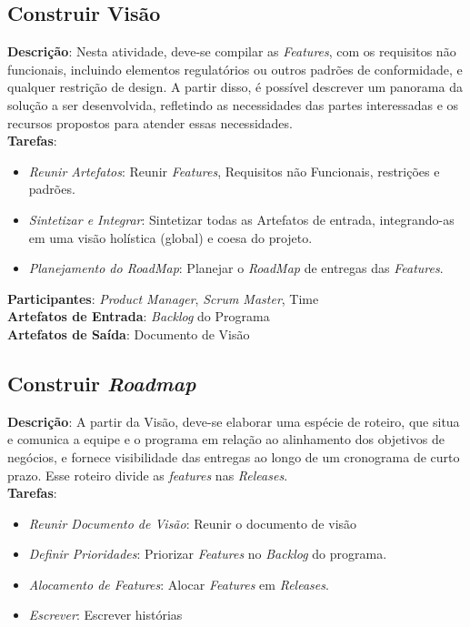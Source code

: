 \subsection{Construir Visão}
  \textbf{Descrição}: Nesta atividade, deve-se compilar as \textit{Features}, com os requisitos não funcionais, incluindo elementos
  regulatórios ou outros padrões de conformidade, e qualquer restrição de design. A partir disso, é possível descrever um panorama da solução a
  ser desenvolvida, refletindo as necessidades das partes interessadas e os recursos propostos para atender essas necessidades. \\

  \textbf{Tarefas}:
  \begin{itemize}
   \item \indent \textit{Reunir Artefatos}: Reunir \textit{Features}, Requisitos não Funcionais, restrições e padrões.

   \item \indent \textit{Sintetizar e Integrar}: Sintetizar todas as Artefatos de entrada, integrando-as em uma visão holística (global) e coesa do projeto.

   \item \indent \textit{Planejamento do \textit{RoadMap}}: Planejar o \textit{RoadMap} de entregas das \textit{Features}.
  \end{itemize}

  \textbf{Participantes}: \textit{Product Manager}, \textit{Scrum Master}, Time \\

  \textbf{Artefatos de Entrada}: \textit{Backlog} do Programa \\

  \textbf{Artefatos de Saída}:  Documento de Visão\\

\subsection{Construir \textit{Roadmap}}
  \textbf{Descrição}: A partir da Visão, deve-se elaborar uma espécie de roteiro, que situa e comunica a equipe e o programa em relação ao
  alinhamento dos objetivos de negócios, e fornece visibilidade das entregas ao longo de um cronograma de curto prazo.
  Esse roteiro divide as \textit{features} nas \textit{Releases}. \\

  \textbf{Tarefas}:
  \begin{itemize}
   \item \indent \textit{Reunir Documento de Visão}: Reunir o documento de visão

   \item \indent \textit{Definir Prioridades}: Priorizar \textit{Features} no \textit{Backlog} do programa.

   \item \indent \textit{Alocamento de \textit{Features}}: Alocar \textit{Features} em \textit{Releases}.

   \item \indent \textit{Escrever}: Escrever histórias
  \end{itemize}

